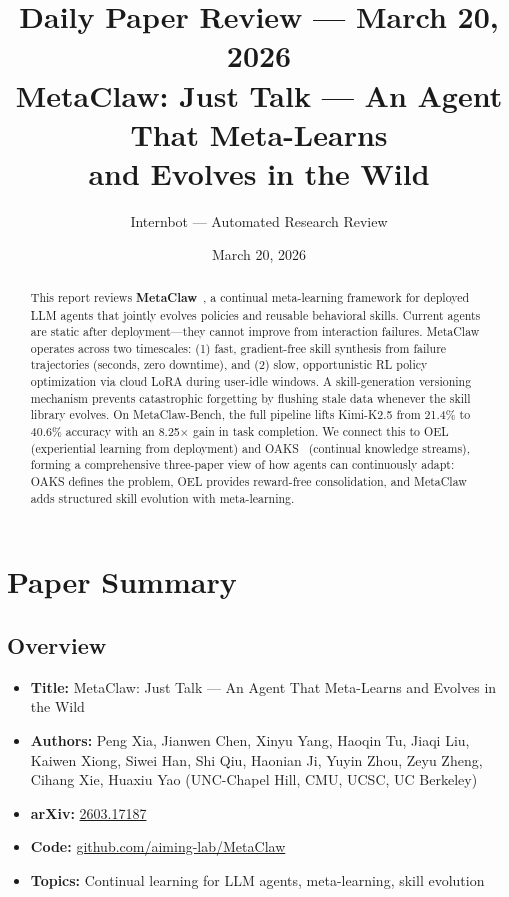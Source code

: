 \documentclass[11pt]{article}
\title{Daily Paper Review --- March 20, 2026\\
\large MetaClaw: Just Talk --- An Agent That Meta-Learns\\and Evolves in the Wild}
\author{Internbot --- Automated Research Review}
\date{March 20, 2026}
\begin{document}
\maketitle

\begin{abstract}
This report reviews \textbf{MetaClaw}~\cite{metaclaw}, a continual meta-learning framework for deployed LLM agents that jointly evolves policies and reusable behavioral skills.
Current agents are static after deployment---they cannot improve from interaction failures.
MetaClaw operates across two timescales: (1) fast, gradient-free skill synthesis from failure trajectories (seconds, zero downtime), and (2) slow, opportunistic RL policy optimization via cloud LoRA during user-idle windows.
A skill-generation versioning mechanism prevents catastrophic forgetting by flushing stale data whenever the skill library evolves.
On MetaClaw-Bench, the full pipeline lifts Kimi-K2.5 from 21.4\% to 40.6\% accuracy with an 8.25$\times$ gain in task completion.
We connect this to OEL~\cite{oel} (experiential learning from deployment) and OAKS~\cite{oaks} (continual knowledge streams), forming a comprehensive three-paper view of how agents can continuously adapt: OAKS defines the problem, OEL provides reward-free consolidation, and MetaClaw adds structured skill evolution with meta-learning.
\end{abstract}

\section{Paper Summary}

\subsection{Overview}
\begin{itemize}
    \item \textbf{Title:} MetaClaw: Just Talk --- An Agent That Meta-Learns and Evolves in the Wild
    \item \textbf{Authors:} Peng Xia, Jianwen Chen, Xinyu Yang, Haoqin Tu, Jiaqi Liu, Kaiwen Xiong, Siwei Han, Shi Qiu, Haonian Ji, Yuyin Zhou, Zeyu Zheng, Cihang Xie, Huaxiu Yao (UNC-Chapel Hill, CMU, UCSC, UC Berkeley)
    \item \textbf{arXiv:} \href{https://arxiv.org/abs/2603.17187}{2603.17187}
    \item \textbf{Code:} \href{https://github.com/aiming-lab/MetaClaw}{github.com/aiming-lab/MetaClaw}
    \item \textbf{Topics:} Continual learning for LLM agents, meta-learning, skill evolution
\end{itemize}
\end{document}
